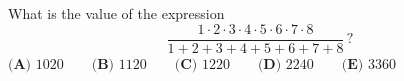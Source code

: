 What is the value of the expression
\[\dfrac{1\cdot2\cdot3\cdot4\cdot5\cdot6\cdot7\cdot8}{1+2+3+4+5+6+7+8}\,?\]
$\textbf{(A) }1020\qquad\textbf{(B) }1120\qquad\textbf{(C) }1220\qquad\textbf{(D) }2240\qquad\textbf{(E) }3360$
